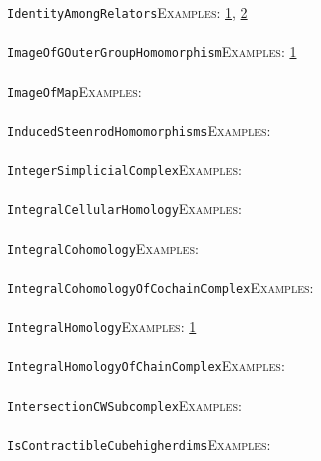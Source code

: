 \documentclass[a4paper,11pt]{report}
\begin{document}
{{ \texttt{IdentityAmongRelators}{\nobreakspace}{\nobreakspace}{\nobreakspace}{\nobreakspace}\textsc{Examples:} \href{../www/SideLinks/About/aboutPeriodic.html} {1}{\nobreakspace}, \href{../www/SideLinks/About/aboutTopology.html} {2}{\nobreakspace} \\
 \\
 \texttt{ImageOfGOuterGroupHomomorphism}{\nobreakspace}{\nobreakspace}{\nobreakspace}{\nobreakspace}\textsc{Examples:} \href{../www/SideLinks/About/aboutCoefficientSequence.html} {1}{\nobreakspace} \\
 \\
 \texttt{ImageOfMap}{\nobreakspace}{\nobreakspace}{\nobreakspace}{\nobreakspace}\textsc{Examples:} \\
 \\
 \texttt{InducedSteenrodHomomorphisms}{\nobreakspace}{\nobreakspace}{\nobreakspace}{\nobreakspace}\textsc{Examples:} \\
 \\
 \texttt{IntegerSimplicialComplex}{\nobreakspace}{\nobreakspace}{\nobreakspace}{\nobreakspace}\textsc{Examples:} \\
 \\
 \texttt{IntegralCellularHomology}{\nobreakspace}{\nobreakspace}{\nobreakspace}{\nobreakspace}\textsc{Examples:} \\
 \\
 \texttt{IntegralCohomology}{\nobreakspace}{\nobreakspace}{\nobreakspace}{\nobreakspace}\textsc{Examples:} \\
 \\
 \texttt{IntegralCohomologyOfCochainComplex}{\nobreakspace}{\nobreakspace}{\nobreakspace}{\nobreakspace}\textsc{Examples:} \\
 \\
 \texttt{IntegralHomology}{\nobreakspace}{\nobreakspace}{\nobreakspace}{\nobreakspace}\textsc{Examples:} \href{../www/SideLinks/About/aboutPerformance.html} {1}{\nobreakspace} \\
 \\
 \texttt{IntegralHomologyOfChainComplex}{\nobreakspace}{\nobreakspace}{\nobreakspace}{\nobreakspace}\textsc{Examples:} \\
 \\
 \texttt{IntersectionCWSubcomplex}{\nobreakspace}{\nobreakspace}{\nobreakspace}{\nobreakspace}\textsc{Examples:} \\
 \\
 \texttt{IsContractibleCube{\textunderscore}higherdims}{\nobreakspace}{\nobreakspace}{\nobreakspace}{\nobreakspace}\textsc{Examples:} \\
}}
\end{document}
